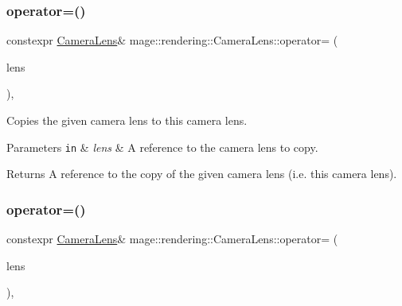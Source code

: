 \subsubsection{\texorpdfstring{operator=()}{operator=()}\hspace{0.1cm}{\footnotesize\ttfamily [1/2]}}
{\footnotesize\ttfamily constexpr \mbox{\hyperlink{classmage_1_1rendering_1_1_camera_lens}{Camera\+Lens}}\& mage\+::rendering\+::\+Camera\+Lens\+::operator= (\begin{DoxyParamCaption}\item[{const \mbox{\hyperlink{classmage_1_1rendering_1_1_camera_lens}{Camera\+Lens}} \&}]{lens }\end{DoxyParamCaption})\hspace{0.3cm}{\ttfamily [default]}, {\ttfamily [noexcept]}}

Copies the given camera lens to this camera lens.


\begin{DoxyParams}[1]{Parameters}
\mbox{\tt in}  & {\em lens} & A reference to the camera lens to copy. \\
\hline
\end{DoxyParams}
\begin{DoxyReturn}{Returns}
A reference to the copy of the given camera lens (i.\+e. this camera lens). 
\end{DoxyReturn}
\mbox{\label{classmage_1_1rendering_1_1_camera_lens_af2c0c0b55951ecec1aa96d452960fe3f}} 
\subsubsection{\texorpdfstring{operator=()}{operator=()}\hspace{0.1cm}{\footnotesize\ttfamily [2/2]}}
{\footnotesize\ttfamily constexpr \mbox{\hyperlink{classmage_1_1rendering_1_1_camera_lens}{Camera\+Lens}}\& mage\+::rendering\+::\+Camera\+Lens\+::operator= (\begin{DoxyParamCaption}\item[{\mbox{\hyperlink{classmage_1_1rendering_1_1_camera_lens}{Camera\+Lens}} \&\&}]{lens }\end{DoxyParamCaption})\hspace{0.3cm}{\ttfamily [default]}, {\ttfamily [noexcept]}}

